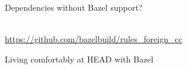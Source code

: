 \documentclass[aspectratio=169]{beamer}
\begin{document}
\begin{frame}{}
    \begin{center}
        \begin{Huge}Dependencies without Bazel support?\end{Huge}\\
        \href{https://github.com/bazelbuild/rules_foreign_cc}{https://github.com/bazelbuild/rules\_foreign\_cc}
    \end{center}
\end{frame}

\begin{frame}{}
    \begin{center}
        \begin{Huge}Living comfortably at HEAD with Bazel\end{Huge}
    \end{center}
\end{frame}
\end{document}

